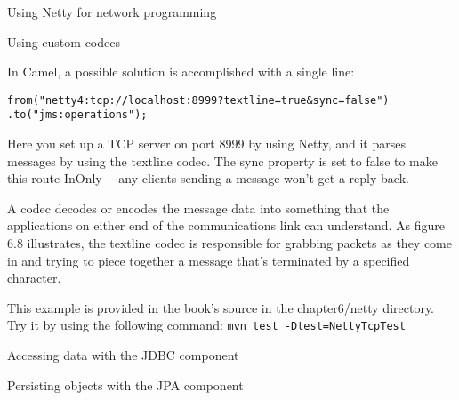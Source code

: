 \documentclass[Screen16to9,17pt]{foils}
\begin{document}
\begin{list2}
\item Using Netty for network programming
\item Using custom codecs
\end{list2}



In Camel, a possible solution is accomplished with a single line:
\begin{verbatim}
from("netty4:tcp://localhost:8999?textline=true&sync=false")
.to("jms:operations");
\end{verbatim}

Here you set up a TCP server on port 8999 by using Netty, and it parses messages
by using the textline codec. The sync property is set to false to make this route
InOnly —any clients sending a message won’t get a reply back.




A codec decodes or encodes the message data into something that the applications
on either end of the communications link can understand. As figure 6.8 illustrates, the
textline codec is responsible for grabbing packets as they come in and trying to piece
together a message that’s terminated by a specified character.

This example is provided in the book’s source in the chapter6/netty directory. Try it by using the following command:
\verb+mvn test -Dtest=NettyTcpTest+


\begin{list2}
\item Accessing data with the JDBC component
\item Persisting objects with the JPA component
\end{list2}



\end{document}
